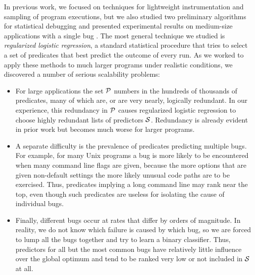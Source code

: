 \documentclass[preprint,final]{sigplanconf}
\newcommand{\termdef}[1]{\emph{#1}}
\begin{document}
In previous work, we focused on techniques
for lightweight instrumentation and sampling of program executions, but
we also studied two preliminary algorithms for statistical debugging and
presented experimental results on medium-size applications with a
single bug \cite{PLDI`03*141,NIPS2003_AP05}.  The most general
technique we studied is \termdef{regularized logistic regression}, a standard
statistical procedure that tries to select a set of predicates that
best predict the outcome of every run. As we worked to apply these
methods to much larger programs under realistic conditions, we
discovered a number of serious scalability problems:
\begin{itemize}

\item For large applications the set ${\cal P}$ numbers in the hundreds of
thousands of predicates, many of which are, or are very nearly,
logically redundant.  In our experience, this redundancy in ${\cal P}$
causes regularized logistic regression to choose highly redundant lists of
predictors ${\cal S}$.  Redundancy is
already evident in prior work \cite{PLDI`03*141} but becomes much
worse for larger programs.

\item A separate difficulty is the prevalence of predicates predicting
multiple bugs.  For example, for many Unix programs a bug is more
likely to be encountered when many command line flags are given,
because the more options that are given non-default settings the more
likely unusual code paths are to be exercised.  Thus, predicates
implying a long command line may rank near the top, even though such
predicates are useless for isolating the cause of individual bugs.

\item Finally, different bugs occur at rates that differ by orders of
magnitude.  In reality, we do not know which failure is caused by which bug,
so we are forced to lump all the bugs together and try to learn a binary
classifier.  Thus, predictors for all but the most common bugs have relatively little
influence over the global optimum and tend to be ranked very low or not included
in ${\cal S}$ at all.

\end{itemize}
\end{document}
